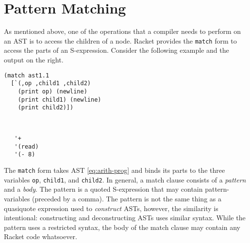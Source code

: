 \documentclass[11pt]{book}
\begin{document}
\section{Pattern Matching}
\label{sec:pattern-matching}

As mentioned above, one of the operations that a compiler needs to
perform on an AST is to access the children of a node.  Racket
provides the \texttt{match} form to access the parts of an
S-expression. Consider the following example and the output on the
right.
\begin{center}
\begin{minipage}{0.5\textwidth}
\begin{lstlisting}
(match ast1.1
  [`(,op ,child1 ,child2)
    (print op) (newline)
    (print child1) (newline)
    (print child2)])
\end{lstlisting}
\end{minipage}
\vrule
\begin{minipage}{0.25\textwidth}
\begin{lstlisting}


   '+
   '(read)
   '(- 8)
\end{lstlisting}
\end{minipage}
\end{center}
The \texttt{match} form takes AST \eqref{eq:arith-prog} and binds its
parts to the three variables \texttt{op}, \texttt{child1}, and
\texttt{child2}. In general, a match clause consists of a
\emph{pattern} and a \emph{body}. The pattern is a quoted S-expression
that may contain pattern-variables (preceded by a comma).
%
The pattern is not the same thing as a quasiquote expression used to
\emph{construct} ASTs, however, the similarity is intentional: constructing and
deconstructing ASTs uses similar syntax.
%
While the pattern uses a restricted syntax,
the body of the match clause may contain any Racket code whatsoever.
\end{document}
